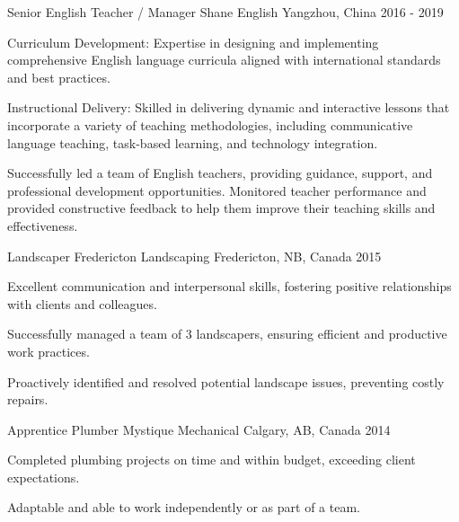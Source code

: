 \begin{cventries}
  \cventry
    {Senior English Teacher / Manager} %
    {Shane English} %
    {Yangzhou, China} %
    {2016 - 2019} %
    {
      \begin{cvitems}
        \item {Curriculum Development: Expertise in designing and implementing comprehensive English language curricula aligned with international standards and best practices.}
        \item {Instructional Delivery: Skilled in delivering dynamic and interactive lessons that incorporate a variety of teaching methodologies, including communicative language teaching, task-based learning, and technology integration.}
        \item {Successfully led a team of English teachers, providing guidance, support, and professional development opportunities. Monitored teacher performance and provided constructive feedback to help them improve their teaching skills and effectiveness.}
      \end{cvitems}
    }

  \cventry
    {Landscaper} %
    {Fredericton Landscaping} %
    {Fredericton, NB, Canada} %
    {2015} %
    {
      \begin{cvitems} %
        \item {Excellent communication and interpersonal skills, fostering positive relationships with clients and colleagues.}
        \item {Successfully managed a team of 3 landscapers, ensuring efficient and productive work practices.}
        \item {Proactively identified and resolved potential landscape issues, preventing costly repairs.}
      \end{cvitems}
    }

  \cventry
    {Apprentice Plumber} %
    {Mystique Mechanical} %
    {Calgary, AB, Canada} %
    {2014} %
    {
      \begin{cvitems} %
        \item {Completed plumbing projects on time and within budget, exceeding client expectations.}
        \item {Adaptable and able to work independently or as part of a team.}
      \end{cvitems}
    }


\end{cventries}
